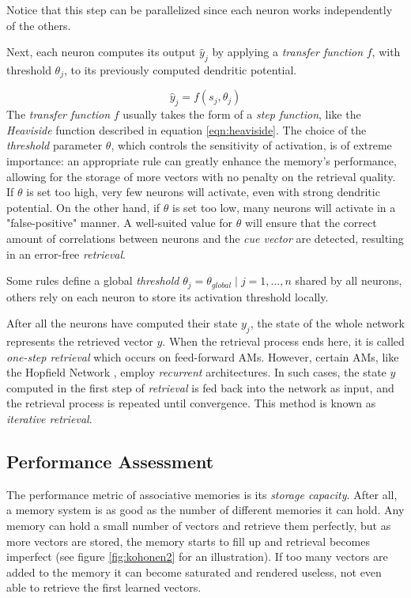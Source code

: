 \documentclass{article}
\begin{document}
Notice that this step can be parallelized since each neuron works independently of the others.

Next, each neuron computes its output $\hat{y}_j$ by applying a \textit{transfer function} $f$, with threshold $\theta_j$, to its previously computed dendritic potential.

\begin{equation}
    \hat{y}_{j}=f\left(s_{j},\theta_j\right)
\end{equation}
The \textit{transfer function} $f$ usually takes the form of a \textit{step function}, like the \textit{Heaviside} function described in equation \ref{eqn:heaviside}. The choice of the \textit{threshold} parameter $\theta$, which controls the sensitivity of activation, is of extreme importance: an appropriate rule can greatly enhance the memory's performance, allowing for the storage of more vectors with no penalty on the retrieval quality. If $\theta$ is set too high, very few neurons will activate, even with strong dendritic potential. On the other hand, if $\theta$ is set too low, many neurons will activate in a "false-positive" manner. A well-suited value for $\theta$ will ensure that the correct amount of correlations between neurons and the \textit{cue vector} are detected, resulting in an error-free \textit{retrieval}.

Some rules define a global \textit{threshold} $\theta_j = \theta_{global} \mid j=1, \ldots, n $ shared by all neurons, others rely on each neuron to store its activation threshold locally.

After all the neurons have computed their state $y_j$, the state of the whole network represents the retrieved vector $y$. When the retrieval process ends here, it is called \textit{one-step retrieval} which occurs on feed-forward AMs. However, certain AMs, like the Hopfield Network \cite{hopfield1982neural}, employ \textit{recurrent} architectures. In such cases, the state $y$ computed in the first step of \textit{retrieval} is fed back into the network as input, and the retrieval process is repeated until convergence. This method is known as \textit{iterative retrieval}.

\subsection{Performance Assessment}
The performance metric of associative memories is its \textit{storage capacity}. After all, a memory system is as good as the number of different memories it can hold. Any memory can hold a small number of vectors and retrieve them perfectly, but as more vectors are stored, the memory starts to fill up and retrieval becomes imperfect (see figure \ref{fig:kohonen2} for an illustration). If too many vectors are added to the memory it can become saturated and rendered useless, not even able to retrieve the first learned vectors.
\end{document}
